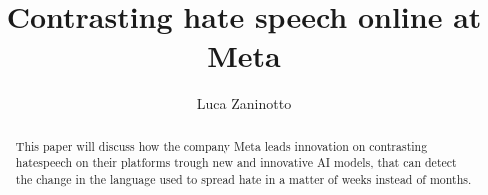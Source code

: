 \documentclass[12pt, a4paper]{article}
\title{Contrasting hate speech online at Meta}
\author{ Luca Zaninotto }
\begin{document}
\maketitle
\begin{abstract}
  This paper will discuss how the company Meta leads innovation on
  contrasting hatespeech on their platforms trough new and innovative
  AI models, that can detect the change in the language used to spread
  hate in a matter of weeks instead of months.
\end{abstract}






\newpage
\printbibliography[title={Bibliography}]
\end{document}
